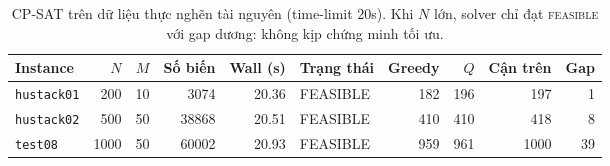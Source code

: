 \begin{table}[ht]
\centering\small
\caption{CP-SAT trên dữ liệu thực nghẽn tài nguyên (time-limit $20$s). Khi $N$
lớn, solver chỉ đạt \textsc{feasible} với gap dương: không kịp chứng minh tối ưu.}
\label{tab:cpsat-real}
\begin{tabular}{lrrrrlrrrr}
\toprule
Instance & $N$ & $M$ & Số biến & Wall (s) & Trạng thái & Greedy & $Q$ & Cận trên & Gap \\
\midrule
\texttt{hustack01} & 200 & 10 & 3074 & 20.36 & FEASIBLE & 182 & 196 & 197 & 1 \\
\texttt{hustack02} & 500 & 50 & 38868 & 20.51 & FEASIBLE & 410 & 410 & 418 & 8 \\
\texttt{test08} & 1000 & 50 & 60002 & 20.93 & FEASIBLE & 959 & 961 & 1000 & 39 \\
\bottomrule
\end{tabular}
\end{table}

